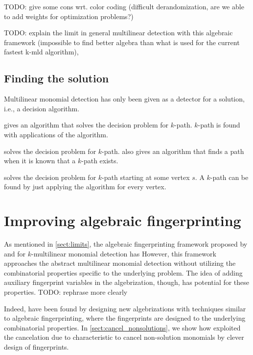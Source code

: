 TODO: give some cons wrt. color coding (difficult derandomization, 
are we able to add weights for optimization problems?) %

TODO: explain the limit in general multilinear detection with this algebraic framework 
(impossible to find better algebra than what is used for the current fastest k-mld algorithm), \cite{KouWil09}

\subsection{Finding the solution}

Multilinear monomial detection has only been given as a detector for a solution,
i.e., a decision algorithm. 

\cite{Koutis08} gives an algorithm that solves the decision problem for $k$-path. 
$k$-path is found with  applications of the algorithm.

\cite{Williams09} solves the decision problem for $k$-path. \cite{Williams09} also gives an algorithm 
that finds a path when it is known that a $k$-path exists.

\cite{Björklund17} solves the decision problem for $k$-path starting at some vertex $s$. 
A $k$-path can be found by just applying the algorithm for every vertex.

\section{Improving algebraic fingerprinting}

As mentioned in \cref{sect:limits}, the algebraic fingerprinting framework proposed by 
\citeauthor{Koutis08} and \citeauthor{Williams09} \cite{Williams09, KouWil15} for 
$k$-multilinear monomial detection has
However, this framework 
approaches the abstract multilinear monomial detection without 
utilizing the combinatorial properties specific to the underlying problem. 
The idea of adding auxiliary fingerprint variables in the algebrization, though, 
has potential for these properties. TODO: rephrase more clearly

Indeed,
 have been found by designing new algebrizations with techniques 
similar to algebraic fingerprinting, where the fingerprints are designed to 
the underlying combinatorial properties. In \cref{sect:cancel_nonsolutions}, 
we show how \citeauthor{Björklund14} \cite{Björklund14}
exploited the cancelation due to characteristic to cancel non-solution monomials 
by clever design of fingerprints. 


